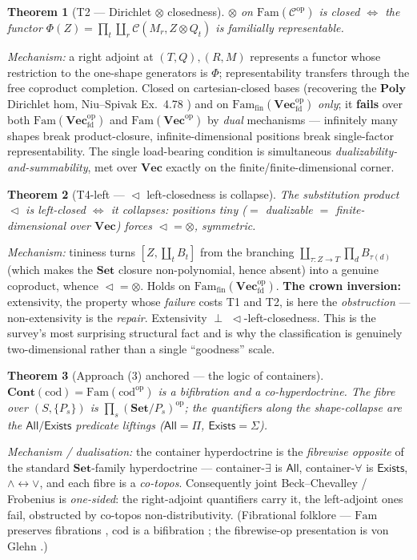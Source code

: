 \documentclass[11pt]{article}
\theoremstyle{plain}
\newtheorem{theorem}{Theorem}
\theoremstyle{definition}
\theoremstyle{remark}
\newcommand{\C}{\mathcal{C}}
\newcommand{\Set}{\mathbf{Set}}
\newcommand{\Vect}{\mathbf{Vec}}
\newcommand{\Vecfd}{\mathbf{Vec}_{\mathrm{fd}}}
\newcommand{\Fam}{\mathrm{Fam}}
\newcommand{\Poly}{\mathbf{Poly}}
\newcommand{\Cont}{\mathbf{Cont}}
\newcommand{\ihom}[2]{[#1,#2]}
\renewcommand{\lhd}{\vartriangleleft}
\newcommand{\op}{\mathrm{op}}
\newcommand{\cod}{\mathrm{cod}}
\newcommand{\All}{\mathsf{All}}
\newcommand{\Exists}{\mathsf{Exists}}
\begin{document}
\begin{theorem}[T2 --- Dirichlet $\otimes$ closedness]
$\otimes$ on $\Fam(\C^\op)$ is closed $\iff$ the functor
$\Phi(Z)=\prod_t\coprod_r\C(M_r,Z\otimes Q_t)$ is familially representable.
\end{theorem}
\noindent\emph{Mechanism:} a right adjoint at $(T,Q),(R,M)$ represents a functor whose restriction to
the one-shape generators is $\Phi$; representability transfers through the free coproduct completion.
Closed on cartesian-closed bases (recovering the $\Poly$ Dirichlet hom, Niu--Spivak Ex.~4.78
\cite{NiuSpivak}) and on $\Fam_{\mathrm{fin}}(\Vecfd^\op)$ \emph{only}; it \textbf{fails} over both
$\Fam(\Vecfd^\op)$ and $\Fam(\Vect^\op)$ by \emph{dual} mechanisms --- infinitely many shapes break
product-closure, infinite-dimensional positions break single-factor representability. The single
load-bearing condition is simultaneous \emph{dualizability-and-summability}, met over $\Vect$ exactly
on the finite/finite-dimensional corner.

\begin{theorem}[T4-left --- $\lhd$ left-closedness is collapse]
The substitution product $\lhd$ is \emph{left}-closed $\iff$ it \emph{collapses}: positions tiny
($=$ dualizable $=$ finite-dimensional over $\Vect$) forces $\lhd=\otimes$, symmetric.
\end{theorem}
\noindent\emph{Mechanism:} tininess turns $\ihom{Z}{\coprod_t B_t}$ from the branching
$\coprod_{\tau\colon Z\to T}\prod_d B_{\tau(d)}$ (which makes the $\Set$ closure non-polynomial, hence
absent) into a genuine coproduct, whence $\lhd=\otimes$. Holds on
$\Fam_{\mathrm{fin}}(\Vecfd^\op)$. \textbf{The crown inversion:} extensivity, the property whose
\emph{failure} costs T1 and T2, is here the \emph{obstruction} --- non-extensivity is the \emph{repair}.
Extensivity $\perp$ $\lhd$-left-closedness. This is the survey's most surprising structural fact and is
why the classification is genuinely two-dimensional rather than a single ``goodness'' scale.

\begin{theorem}[Approach (3) anchored --- the logic of containers]
$\Cont(\cod)=\Fam(\cod^\op)$ is a \emph{bifibration} and a \emph{co-hyperdoctrine}. The fibre over
$(S,\{P_s\})$ is $\prod_s(\Set/P_s)^\op$; the quantifiers along the shape-collapse are the $\All/\Exists$
predicate liftings ($\All=\Pi$, $\Exists=\Sigma$).
\end{theorem}
\noindent\emph{Mechanism / dualisation:} the container hyperdoctrine is the \emph{fibrewise opposite}
of the standard $\Set$-family hyperdoctrine --- container-$\exists$ is $\All$, container-$\forall$ is
$\Exists$, $\wedge\leftrightarrow\vee$, and each fibre is a \emph{co-topos}. Consequently joint
Beck--Chevalley / Frobenius is \emph{one-sided}: the right-adjoint quantifiers carry it, the
left-adjoint ones fail, obstructed by co-topos non-distributivity. (Fibrational folklore --- $\Fam$
preserves fibrations \cite{Hermida}, $\cod$ is a bifibration \cite{Jacobs}; the fibrewise-op
presentation is von Glehn \cite{vonGlehn}.)
\end{document}
